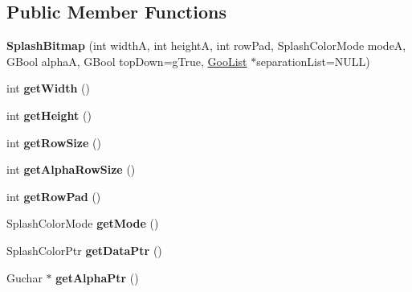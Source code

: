 \subsection*{Public Member Functions}
\begin{DoxyCompactItemize}
\item 
\mbox{\label{class_splash_bitmap_ab24f0c7654574673d715b60ee1a3a814}} 
{\bfseries Splash\+Bitmap} (int widthA, int heightA, int row\+Pad, Splash\+Color\+Mode modeA, G\+Bool alphaA, G\+Bool top\+Down=g\+True, \hyperlink{class_goo_list}{Goo\+List} $\ast$separation\+List=N\+U\+LL)
\item 
\mbox{\label{class_splash_bitmap_a406a78ed2e1ac7b30a41700f5339e711}} 
int {\bfseries get\+Width} ()
\item 
\mbox{\label{class_splash_bitmap_a9cd43246b964422ff2be77d3816ab96a}} 
int {\bfseries get\+Height} ()
\item 
\mbox{\label{class_splash_bitmap_a8c5d01027f794273cf39eafa331267aa}} 
int {\bfseries get\+Row\+Size} ()
\item 
\mbox{\label{class_splash_bitmap_af00c3c9a20916d10ee21bd9547026314}} 
int {\bfseries get\+Alpha\+Row\+Size} ()
\item 
\mbox{\label{class_splash_bitmap_af2e6144f43c56abc2e4691eebea660a0}} 
int {\bfseries get\+Row\+Pad} ()
\item 
\mbox{\label{class_splash_bitmap_aed3e7629aa65f40108d118da81817343}} 
Splash\+Color\+Mode {\bfseries get\+Mode} ()
\item 
\mbox{\label{class_splash_bitmap_a00a9c81f3d274cff727e554ec47bfa39}} 
Splash\+Color\+Ptr {\bfseries get\+Data\+Ptr} ()
\item 
\mbox{\label{class_splash_bitmap_ad29da55bc9bd6149446a376200e7c2c3}} 
Guchar $\ast$ {\bfseries get\+Alpha\+Ptr} ()
\item 
\mbox{\label{class_splash_bitmap_a1b8555cd58da4450ec43d6ddf70b77cc}} 

\end{DoxyCompactItemize}
